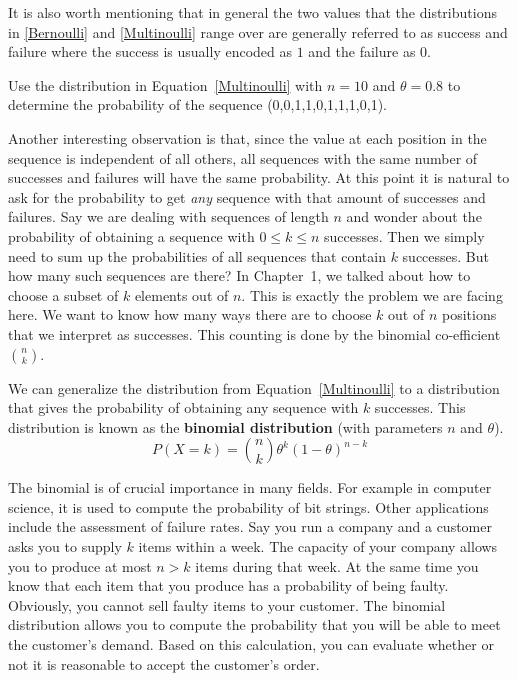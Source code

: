 It is also worth mentioning that in general the two values that the distributions in \eqref{Bernoulli} and \eqref{Multinoulli} range
over are generally referred to as success and failure where the success is usually encoded as $ 1 $ and the failure as $ 0 $. 

\begin{Exercise}
Use the distribution in Equation~\eqref{Multinoulli} with $ n = 10 $ and $ \theta = 0.8 $ to determine the probability of the sequence (0,0,1,1,0,1,1,1,0,1).
\end{Exercise}

Another interesting observation is that, since the value at each position in the sequence is independent of all others, all sequences with the same
number of successes and failures will have the same probability. At this point it is natural to ask for the probability to get \textit{any}
sequence with that amount of successes and failures. Say we are dealing with sequences of length $ n $ and wonder about the probability of 
obtaining a sequence with $ 0 \leq k \leq n $ successes. Then we simply need to sum up the probabilities of all sequences that contain $ k $ 
successes. But how many such sequences are there? In Chapter~1, we talked about how to choose a subset of $ k $ elements
out of $ n $. This is exactly the problem we are facing here. We want to know how many ways there are to choose $ k $ out of $ n $ positions
that we interpret as successes. This counting is done by the binomial co-efficient $ \binom{n}{k} $.

We can generalize the distribution from Equation~\eqref{Multinoulli} to a distribution that gives the probability of obtaining any sequence
with $ k $ successes. This distribution is known as the \textbf{binomial distribution} (with parameters $ n $ and $ \theta $).
\begin{equation}
P(X=k) = \binom{n}{k} \theta^{k} (1-\theta)^{n-k}
\end{equation}

The binomial is of crucial importance in many fields. For example in computer science, it is used to compute the probability of bit strings.
Other applications include the assessment of failure rates. Say you run a company and a customer asks you to supply $ k $ items within a week.
The capacity of your company allows you to produce at most $ n > k $ items during that week. At the same time you know that each item that you 
produce has a probability of being faulty. Obviously, you cannot sell faulty items to your customer. The binomial distribution allows you to
compute the probability that you will be able to meet the customer's demand. Based on this calculation, you can evaluate whether or not it is reasonable to
accept the customer's order.

